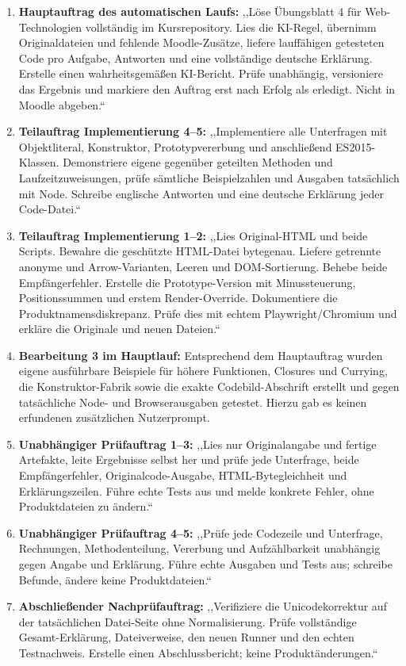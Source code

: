 \documentclass[11pt,a4paper]{article}
\newcommand{\datei}[1]{\texttt{\detokenize{#1}}}
\begin{document}
\begin{enumerate}
\item \textbf{Hauptauftrag des automatischen Laufs:} ,,Löse Übungsblatt 4 für Web-Technologien vollständig im Kursrepository. Lies die KI-Regel, übernimm Originaldateien und fehlende Moodle-Zusätze, liefere lauffähigen getesteten Code pro Aufgabe, Antworten und eine vollständige deutsche Erklärung. Erstelle einen wahrheitsgemäßen KI-Bericht. Prüfe unabhängig, versioniere das Ergebnis und markiere den Auftrag erst nach Erfolg als erledigt. Nicht in Moodle abgeben.``
\item \textbf{Teilauftrag Implementierung 4--5:} ,,Implementiere alle Unterfragen mit Objektliteral, Konstruktor, Prototypvererbung und anschließend ES2015-Klassen. Demonstriere eigene gegenüber geteilten Methoden und Laufzeitzuweisungen, prüfe sämtliche Beispielzahlen und Ausgaben tatsächlich mit Node. Schreibe englische Antworten und eine deutsche Erklärung jeder Code-Datei.``
\item \textbf{Teilauftrag Implementierung 1--2:} ,,Lies Original-HTML und beide Scripts. Bewahre die geschützte HTML-Datei bytegenau. Liefere getrennte anonyme und Arrow-Varianten, Leeren und DOM-Sortierung. Behebe beide Empfängerfehler. Erstelle die Prototype-Version mit Minussteuerung, Positionssummen und erstem Render-Override. Dokumentiere die Produktnamensdiskrepanz. Prüfe dies mit echtem Playwright/Chromium und erkläre die Originale und neuen Dateien.``
\item \textbf{Bearbeitung 3 im Hauptlauf:} Entsprechend dem Hauptauftrag wurden eigene ausführbare Beispiele für höhere Funktionen, Closures und Currying, die Konstruktor-Fabrik \datei{getEventHandler()} sowie die exakte Codebild-Abschrift erstellt und gegen tatsächliche Node- und Browserausgaben getestet. Hierzu gab es keinen erfundenen zusätzlichen Nutzerprompt.
\item \textbf{Unabhängiger Prüfauftrag 1--3:} ,,Lies nur Originalangabe und fertige Artefakte, leite Ergebnisse selbst her und prüfe jede Unterfrage, beide Empfängerfehler, Originalcode-Ausgabe, HTML-Bytegleichheit und Erklärungszeilen. Führe echte Tests aus und melde konkrete Fehler, ohne Produktdateien zu ändern.``
\item \textbf{Unabhängiger Prüfauftrag 4--5:} ,,Prüfe jede Codezeile und Unterfrage, Rechnungen, Methodenteilung, Vererbung und Aufzählbarkeit unabhängig gegen Angabe und Erklärung. Führe echte Ausgaben und Tests aus; schreibe Befunde, ändere keine Produktdateien.``
\item \textbf{Abschließender Nachprüfauftrag:} ,,Verifiziere die Unicodekorrektur auf der tatsächlichen Datei-Seite ohne Normalisierung. Prüfe vollständige Gesamt-Erklärung, Dateiverweise, den neuen Runner und den echten Testnachweis. Erstelle einen Abschlussbericht; keine Produktänderungen.``
\end{enumerate}
\end{document}
